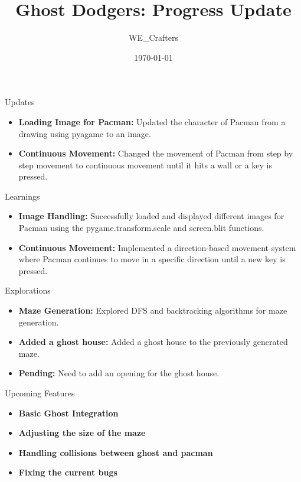 \documentclass{beamer}
\title{Ghost Dodgers: Progress Update}
\author{WE\_Crafters}
\date{\today}
\begin{document}
\begin{frame}
  \titlepage
\end{frame}

\begin{frame}{Updates}
	\begin{itemize}
		\item \textbf{Loading Image for Pacman:} Updated the character of Pacman from a drawing using pyagame to an image.
		\item \textbf{Continuous Movement:} Changed the movement of Pacman from step by step movement to continuous movement until it hits a wall or a key is pressed.
	\end{itemize}
\end{frame}

\begin{frame}{Learnings}
	\begin{itemize}
		\item \textbf{Image Handling:} Successfully loaded and displayed different images for Pacman using the pygame.transform.scale and screen.blit functions.
		\item \textbf{Continuous Movement:} Implemented a direction-based movement system where Pacman continues to move in a specific direction until a new key is pressed.
	\end{itemize}
\end{frame}

\begin{frame}{Explorations}
	\begin{itemize}
		\item \textbf{Maze Generation:} Explored DFS and backtracking algorithms for maze generation.
		\item \textbf{Added a ghost house:} Added a ghost house to the previously generated maze.
		\item \textbf{Pending:} Need to add an opening for the ghost house.
	\end{itemize}
\end{frame}

\begin{frame}{Upcoming Features}
	\begin{itemize}
		\item \textbf{Basic Ghost Integration}
		\item \textbf{Adjusting the size of the maze}
		\item \textbf{Handling collisions between ghost and pacman}
		\item \textbf{Fixing the current bugs}
	\end{itemize}
\end{frame}
\end{document}
